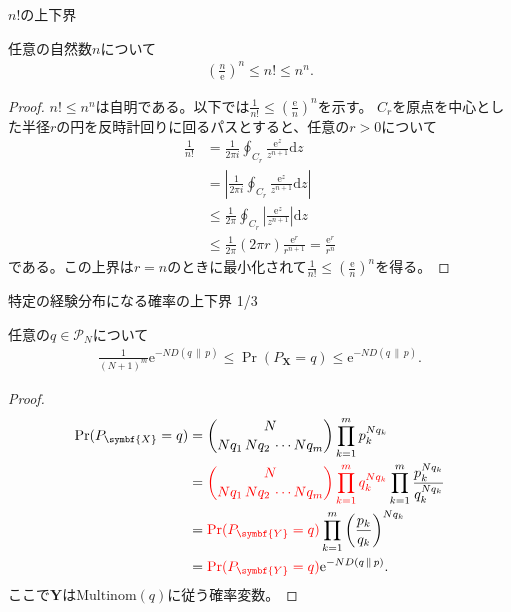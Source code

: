 \documentclass[lualatex,handout]{beamer}
\newcommand{\mycolor}[2]{%
  \begingroup
  \colorlet{currentcolor}{.}%
  \color{#1}#2%
  \color{currentcolor}%
  \endgroup
}
\newcommand{\emm}[1]{\mycolor{red}{#1}}
\newcommand\KL[2]{D(#1\,\|\,#2)}
\theoremstyle{definition}
\begin{document}
\begin{frame}{$n!$の上下界}
\footnotesize
\begin{lemma}
任意の自然数$n$について
\begin{align*}
\left(\frac{n}{\mathrm{e}}\right)^n\le n!\le n^n.
\end{align*}
\vspace{-1em}
\begin{proof}
$n!\le n^n$は自明である。以下では$\frac1{n!}\le \left(\frac{\mathrm{e}}{n}\right)^n$を示す。
%
$C_r$を原点を中心とした半径$r$の円を反時計回りに回るパスとすると、任意の$r>0$について
\begin{align*}
\frac1{n!} &= \frac1{2\pi i} \oint_{C_r} \frac{\mathrm{e}^z}{z^{n+1}}\mathrm{d}z\\
 &= \left|\frac1{2\pi i} \oint_{C_r} \frac{\mathrm{e}^z}{z^{n+1}}\mathrm{d}z\right|\\
&\le \frac1{2\pi } \oint_{C_r} \left|\frac{\mathrm{e}^z}{z^{n+1}}\right|\mathrm{d}z\\
&\le \frac1{2\pi } (2\pi r) \frac{\mathrm{e}^r}{r^{n+1}} = \frac{\mathrm{e}^r}{r^n}
\end{align*}
である。この上界は$r=n$のときに最小化されて$\frac1{n!}\le\left(\frac{\mathrm{e}}{n}\right)^n$を得る。
\end{proof}
\end{lemma}
\end{frame}
\fi

\begin{frame}{特定の経験分布になる確率の上下界 1/3}
\footnotesize
\begin{lemma}
任意の$q\in\mathcal{P}_N$について
\begin{align*}
\frac1{(N+1)^m}\mathrm{e}^{-N \KL{q}{p}}\le
\Pr(P_{\symbf{X}} = q)
\le \mathrm{e}^{-N \KL{q}{p}}.
\end{align*}
\end{lemma}
\begin{proof}
\vspace{-2em}
\begin{align*}
\Pr(P_{\symbf{X}}= q) &= \binom{N}{Nq_1\,Nq_2\,\dotsm Nq_m} \prod_{k=1}^m p_k^{Nq_k}\\
 &= \emm{\binom{N}{Nq_1\,Nq_2\,\dotsm Nq_m} \prod_{k=1}^m q_k^{Nq_k}}\prod_{k=1}^m\frac{p_k^{Nq_k}}{q_k^{Nq_k}}\\
 &= \emm{\Pr(P_{\symbf{Y}}= q)}\prod_{k=1}^m\left(\frac{p_k}{q_k}\right)^{Nq_k}\\
 &=\emm{\Pr(P_{\symbf{Y}}= q)}\mathrm{e}^{-N \KL{q}{p}}.
\end{align*}
ここで$\symbf{Y}$は$\mathrm{Multinom}(q)$に従う確率変数。
\end{proof}
\end{frame}
\end{document}
